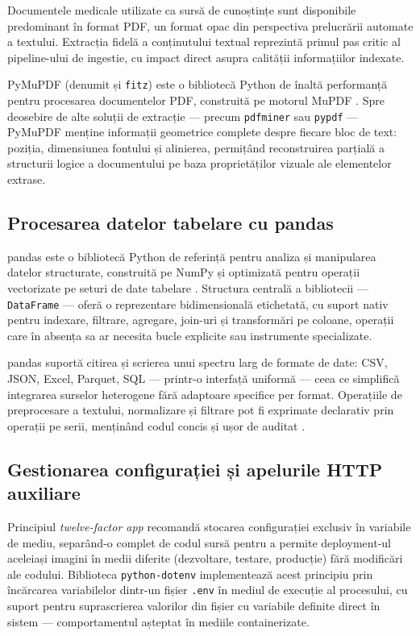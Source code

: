\documentclass[12pt, a4paper, oneside, romanian]{teza-upb}
\begin{document}
Documentele medicale utilizate ca sursă de cunoștințe sunt disponibile predominant în format PDF, un format opac din perspectiva prelucrării automate a textului. Extracția fidelă a conținutului textual reprezintă primul pas critic al pipeline-ului de ingestie, cu impact direct asupra calității informațiilor indexate.

PyMuPDF (denumit și \texttt{fitz}) este o bibliotecă Python de înaltă performanță pentru procesarea documentelor PDF, construită pe motorul MuPDF \cite{pymupdf_doc}. Spre deosebire de alte soluții de extracție — precum \texttt{pdfminer} sau \texttt{pypdf} — PyMuPDF menține informații geometrice complete despre fiecare bloc de text: poziția, dimensiunea fontului și alinierea, permițând reconstruirea parțială a structurii logice a documentului pe baza proprietăților vizuale ale elementelor extrase.

\subsection{Procesarea datelor tabelare cu pandas}

pandas este o bibliotecă Python de referință pentru analiza și manipularea datelor structurate, construită pe NumPy și optimizată pentru operații vectorizate pe seturi de date tabelare \cite{pandas_doc}. Structura centrală a bibliotecii — \texttt{DataFrame} — oferă o reprezentare bidimensională etichetată, cu suport nativ pentru indexare, filtrare, agregare, join-uri și transformări pe coloane, operații care în absența sa ar necesita bucle explicite sau instrumente specializate.

pandas suportă citirea și scrierea unui spectru larg de formate de date: CSV, JSON, Excel, Parquet, SQL — printr-o interfață uniformă — ceea ce simplifică integrarea surselor heterogene fără adaptoare specifice per format. Operațiile de preprocesare a textului, normalizare și filtrare pot fi exprimate declarativ prin operații pe serii, menținând codul concis și ușor de auditat \cite{pandas_doc}.

\subsection{Gestionarea configurației și apelurile HTTP auxiliare}

Principiul \textit{twelve-factor app} recomandă stocarea configurației exclusiv în variabile de mediu, separând-o complet de codul sursă pentru a permite deployment-ul aceleiași imagini în medii diferite (dezvoltare, testare, producție) fără modificări ale codului. Biblioteca \texttt{python-dotenv} implementează acest principiu prin încărcarea variabilelor dintr-un fișier \texttt{.env} în mediul de execuție al procesului, cu suport pentru suprascrierea valorilor din fișier cu variabile definite direct în sistem — comportamentul așteptat în mediile containerizate.
\end{document}
